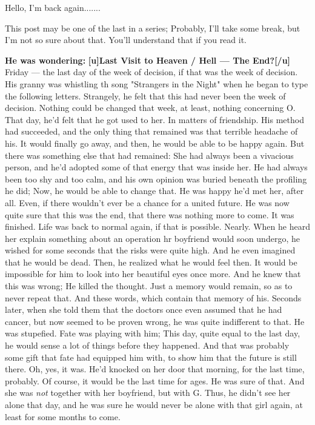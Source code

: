 Hello, I'm back again.......

This post may be one of the last in a series; Probably, I'll take some break, but I'm not so sure about that. 
You'll understand that if you read it. 

\textbf{He was wondering:}
\textbf{[u]Last Visit to Heaven / Hell --- The End?[/u]}
Friday --- the last day of the week of decision, if that was the week of decision. 
His granny was whistling th song "Strangers in the Night" when he began to type the following letters. 
Strangely, he felt that this had never been the week of decision. 
Nothing could be changed that week, at least, nothing concerning O. 
That day, he'd felt that he got used to her. 
In matters of friendship. His method had succeeded, and the only thing that remained was that terrible headache of his. 
It would finally go away, and then, he would be able to be happy again. 
But there was something else that had remained: She had always been a vivacious person, and he'd adopted some of that energy that was inside her. 
He had always been too shy and too calm, and his own opinion was buried beneath the profiling he did; Now, he would be able to change that. 
He was happy he'd met her, after all. 
Even, if there wouldn't ever be a chance for a united future. 
He was now quite sure that this was the end, that there was nothing more to come. 
It was finished. 
Life was back to normal again, if that is possible. 
Nearly. 
When he heard her explain something about an operation hr boyfriend would soon undergo, he wished for some seconds that the risks were quite high. 
And he even imagined that he would be dead. 
Then, he realized what he would feel then. It would be impossible for him to look into her beautiful eyes once more. 
And he knew that this was wrong; He killed the thought. 
Just a memory would remain, so as to never repeat that. 
And these words, which contain that memory of his. 
Seconds later, when she told them that the doctors once even assumed that he had cancer, but now seemed to be proven wrong, he was quite indifferent to that. 
He was stupefied. 
Fate was playing with him; This day, quite equal to the last day, he would sense a lot of things before they happened. 
And that was probably some gift that fate had equipped him with, to show him that the future is still there. 
Oh, yes, it was. 
He'd knocked on her door that morning, for the last time, probably. 
Of course, it would be the last time for ages. 
He was sure of that. 
And she was \emph{not} together with her boyfriend, but with G. 
Thus, he didn't see her alone that day, and he was sure he would never be alone with that girl again, at least for some months to come. 
